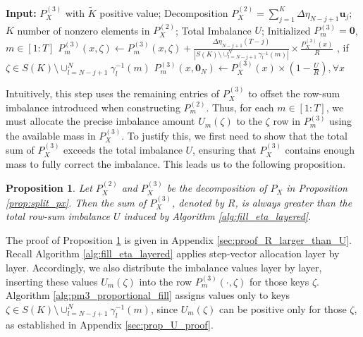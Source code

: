 \documentclass[11pt,letterpaper]{article}
\newtheorem{prop}{\textbf{Proposition}}
\begin{document}
\begin{algorithm}[h]
\caption{$P_m^{(3)}$ Construction}
\label{alg:pm3_proportional_fill}
\begin{algorithmic}[1]
\State \textbf{Input:} $P_X^{(3)}$ with $\tilde{K}$ positive value; Decomposition $P_X^{(2)} = \sum_{j=1}^K \Delta\eta_{N-j+1}\boldsymbol{u}_j$; $K$ number of nonzero elements in $P_X^{(2)}$; Total Imbalance $U$; Initialized $P_m^{(3)} =\mathbf{0}$, $m \in [1:T]$
        \State $P_m^{(3)}(x,\zeta) \gets P_m^{(3)}(x,\zeta) + \frac{\Delta\eta_{N-j+1}(T-j)}{|S(K) \setminus \cup_{l=N-j+1}^N \gamma^{-1}_l(m)|}\times \frac{P_X^{(3)}(x)}{R}$ , if $\zeta \in S(K) \setminus \cup_{l=N-j+1}^N \gamma^{-1}_l(m)  $ \label{alg-eq:allocate_imbalance}
    \EndFor
\EndFor
\State $P_m^{(3)}(x, \mathbf{0}_N) \gets P_X^{(3)}(x) \times (1-\frac{U}{R}), \forall x$
\end{algorithmic}
\end{algorithm}


Intuitively, this step uses the remaining entries of $P_X^{(3)}$ to offset the row-sum imbalance introduced when constructing $P_m^{(2)}$. Thus, for each $m \in [1:T]$, we must allocate the precise imbalance amount $U_m(\zeta)$ to the $\zeta$ row in $P_m^{(3)}$ using the available mass in $P_X^{(3)}$. To justify this, we first need to show that the total sum of $P_X^{(3)}$ exceeds the total imbalance $U$, ensuring that $P_X^{(3)}$ contains enough mass to fully correct the imbalance. This leads us to the following proposition. 

\begin{prop} \label{prop:R_larger_than_U}
    Let $P_X^{(2)}$ and $P_X^{(3)}$ be the decomposition of $P_X$ in Proposition \ref{prop:split_px}. Then the sum of $P_X^{(3)}$, denoted by $R$, is always greater than the total row-sum imbalance $U$ induced by Algorithm \ref{alg:fill_eta_layered}.
\end{prop}


The proof of Proposition \ref{prop:R_larger_than_U} is given in Appendix \ref{sec:proof_R_larger_than_U}. Recall Algorithm \ref{alg:fill_eta_layered} applies step-vector allocation layer by layer. Accordingly, we also distribute the imbalance values layer by layer, inserting these values $U_m(\zeta)$ into the row $P_m^{(3)}(\cdot, \zeta)$ for those keys $\zeta$. 
Algorithm \ref{alg:pm3_proportional_fill} assigns values only to keys $\zeta \in S(K) \setminus \cup_{l=N-j+1}^N \gamma^{-1}_l(m)$, since $U_m(\zeta)$ can be positive only for those $\zeta$, as established in Appendix \ref{sec:prop_U_proof}.
\end{document}

